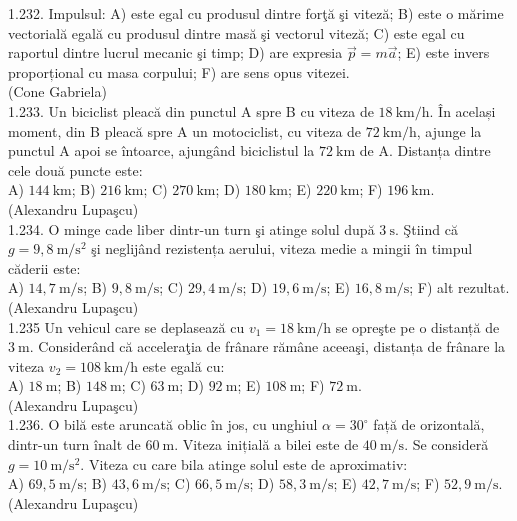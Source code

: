 {1.232. Impulsul: A) este egal cu produsul dintre forţă şi viteză; B) este o mărime vectorială egală cu produsul dintre masă şi vectorul viteză; C) este egal cu raportul dintre lucrul mecanic şi timp; D) are expresia $\vec{p}=m \vec{a}$; E) este invers proporțional cu masa corpului; F) are sens opus vitezei.\\ (Cone Gabriela)\\

1.233. Un biciclist pleacă din punctul A spre B cu viteza de $18 \mathrm{~km} / \mathrm{h}$. În același moment, din B pleacă spre A un motociclist, cu viteza de $72 \mathrm{~km} / \mathrm{h}$, ajunge la punctul A apoi se întoarce, ajungând biciclistul la $72 \mathrm{~km}$ de A. Distanța dintre cele două puncte este:\\ A) $144 \mathrm{~km}$; B) $216 \mathrm{~km}$; C) $270 \mathrm{~km}$; D) $180 \mathrm{~km}$; E) $220 \mathrm{~km}$; F) $196 \mathrm{~km}$.\\ (Alexandru Lupaşcu)\\

1.234. O minge cade liber dintr-un turn şi atinge solul după $3 \mathrm{~s}$. Ştiind că $g=9,8 \mathrm{~m} / \mathrm{s}^{2}$ şi neglijând rezistența aerului, viteza medie a mingii în timpul căderii este:\\ A) $14,7 \mathrm{~m} / \mathrm{s}$; B) $9,8 \mathrm{~m} / \mathrm{s}$; C) $29,4 \mathrm{~m} / \mathrm{s}$; D) $19,6 \mathrm{~m} / \mathrm{s}$; E) $16,8 \mathrm{~m} / \mathrm{s}$; F) alt rezultat.\\ (Alexandru Lupaşcu)\\

1.235 Un vehicul care se deplasează cu $v_{1}=18 \mathrm{~km} / \mathrm{h}$ se opreşte pe o distanță de $3 \mathrm{~m}$. Considerând că acceleraţia de frânare rămâne aceeaşi, distanța de frânare la viteza $v_{2}=108 \mathrm{~km} / \mathrm{h}$ este egală cu:\\ A) $18 \mathrm{~m}$; B) $148 \mathrm{~m}$; C) $63 \mathrm{~m}$; D) $92 \mathrm{~m}$; E) $108 \mathrm{~m}$; F) $72 \mathrm{~m}$.\\ (Alexandru Lupaşcu)\\

1.236. O bilă este aruncată oblic în jos, cu unghiul $\alpha=30^{\circ}$ față de orizontală, dintr-un turn înalt de $60 \mathrm{~m}$. Viteza inițială a bilei este de $40 \mathrm{~m} / \mathrm{s}$. Se consideră $g=10 \mathrm{~m} / \mathrm{s}^{2}$. Viteza cu care bila atinge solul este de aproximativ:\\ A) $69,5 \mathrm{~m} / \mathrm{s}$; B) $43,6 \mathrm{~m} / \mathrm{s}$; C) $66,5 \mathrm{~m} / \mathrm{s}$; D) $58,3 \mathrm{~m} / \mathrm{s}$; E) $42,7 \mathrm{~m} / \mathrm{s}$; F) $52,9 \mathrm{~m} / \mathrm{s}$.\\ (Alexandru Lupaşcu)\\

}
